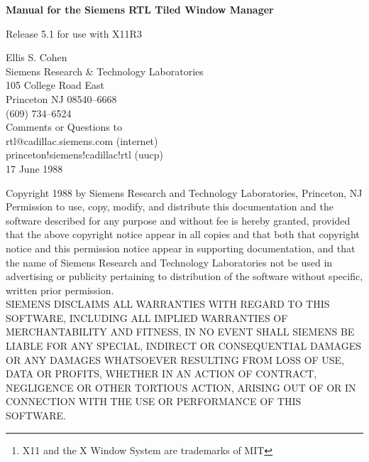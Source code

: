 \begin{titlepage}

\begin{center}
{\LARGE\bf
Manual for the
Siemens RTL
Tiled Window Manager
\vspace{1ex}

\large
Release 5.1
for use with X11R3
\vspace{3ex}

Ellis S. Cohen\\
Siemens Research \& Technology Laboratories\\
105 College Road East\\
Princeton NJ 08540--6668\\
(609) 734--6524\\[1ex]
Comments or Questions to\\
rtl@cadillac.siemens.com (internet)\\
princeton!siemens!cadillac!rtl (uucp)\\[1ex]
17 June 1988
}
\end{center}

\vfill

\begin{abstract}
This manual provides a detailed description of Release 5.1 of the Siemens
RTL Tiled Window Manager, a window manager for X11\footnote{X11 and the X Window
System are trademarks of MIT} clients.

{\bf A separate document, ``Tutorial: Initial Setup for Using the
Siemens RTL Tiled Window Manager'', should be read first by novice users
of the system.}
\end{abstract}

\vfill

\noindent Copyright 1988 by Siemens Research and Technology
Laboratories, Princeton, NJ \\

\noindent Permission to use, copy, modify, and distribute this documentation and
the software described for any purpose and without fee is hereby granted,
provided that the above copyright notice appear in all copies and that
both that copyright notice and this permission notice appear in
supporting documentation, and that the name of Siemens Research and Technology
Laboratories not be used in advertising or publicity pertaining to
distribution of the software without specific, written prior
permission. \\

\noindent SIEMENS DISCLAIMS ALL WARRANTIES WITH REGARD TO THIS SOFTWARE, INCLUDING
ALL IMPLIED WARRANTIES OF MERCHANTABILITY AND FITNESS, IN NO EVENT SHALL
SIEMENS BE LIABLE FOR ANY SPECIAL, INDIRECT OR CONSEQUENTIAL DAMAGES OR
ANY DAMAGES WHATSOEVER RESULTING FROM LOSS OF USE, DATA OR PROFITS,
WHETHER IN AN ACTION OF CONTRACT, NEGLIGENCE OR OTHER TORTIOUS ACTION,
ARISING OUT OF OR IN CONNECTION WITH THE USE OR PERFORMANCE OF THIS
SOFTWARE.

\end{titlepage}



